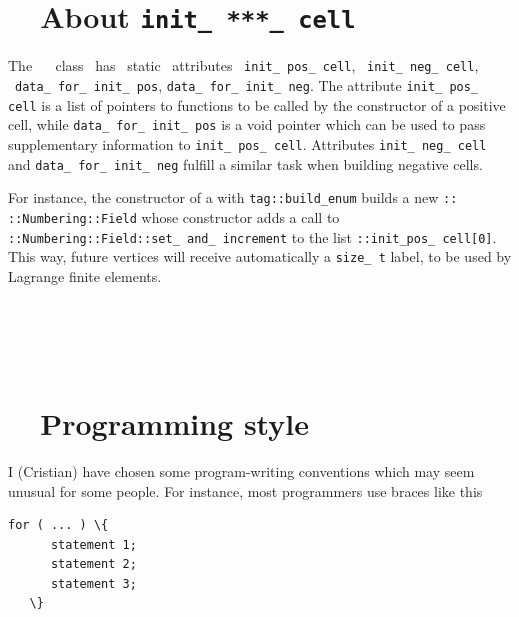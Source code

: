 \section{~~About {\tt init\_\,***\_\,cell}}\label{\numb section 11.\numb parag 10}

The \ {\small\tt{}} \ class \ has \ static \ attributes \ {\small\tt init\_\,pos\_\,cell},
\ {\small\tt init\_\,neg\_\,cell}, \ {\small\tt data\_\,for\_\,init\_\,pos},
{\small\tt data\_\,for\_\,init\_\,neg}.
The attribute {\small\tt init\_\,pos\_\,cell} is a list of pointers to functions to be called by
the constructor of a positive cell, while {\small\tt data\_\,for\_\,init\_\,pos} is a void pointer
which can be used to pass supplementary information to {\small\tt init\_\,pos\_\,cell}.
Attributes {\small\tt init\_\,neg\_\,cell} and {\small\tt data\_\,for\_\,init\_\,neg} fulfill
a similar task when building negative cells.

For instance, the constructor of a {\small\tt{}} with
{\small\tt\textcolor{tag}{tag}::build\_\;enum} builds a new
{\small\tt{}:: ::Numbering::Field} whose constructor
adds a call to {\small\tt{}::Numbering::Field::set\_\,and\_\,increment} to
the list {\small\tt{}::init\_\;pos\_\,cell[0]}.
This way, future vertices will receive automatically a {\small\tt size\_\,t} label, to be used
by Lagrange finite elements.


\section{~~\cinza{[empty]}}\label{\numb section 11.\numb parag 11}


\section{~~Programming style}\label{\numb section 11.\numb parag 12}

I (Cristian) have chosen some program-writing conventions which may seem unusual for some people.
For instance, most programmers use braces like this

\begin{Verbatim}[commandchars=\\\{\},formatcom=\small\tt,baselinestretch=0.94]
   for ( ... ) \{
      statement 1;
      statement 2;
      statement 3;
   \}
\end{Verbatim}


